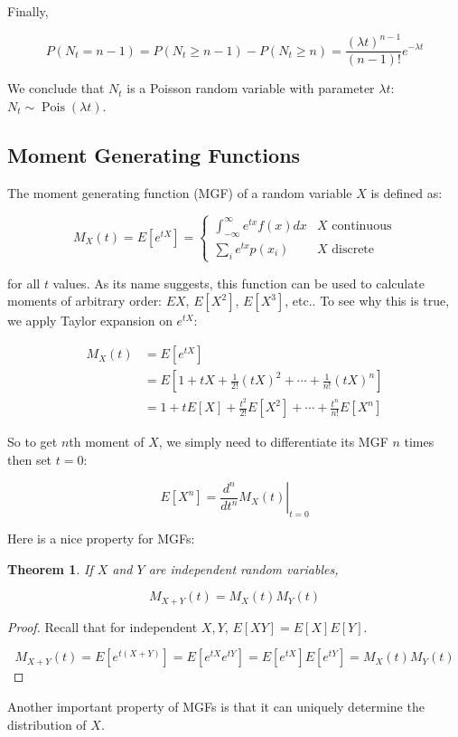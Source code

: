 \documentclass[12pt, a4paper]{article}
\newcommand{\Pois}{\operatorname{Pois}}
\newtheorem*{theorem}{Theorem}
\begin{document}
Finally,

\[P(N_t=n-1)=P(N_t \ge n-1) - P(N_t \ge n) = \frac{(\lambda t)^{n-1}}{(n-1)!} e^{-\lambda t}\]

We conclude that $N_t$ is a Poisson random variable with parameter $\lambda t$: $N_t\sim\Pois(\lambda t)$.

\subsection{Moment Generating Functions}

The moment generating function (MGF) of a random variable $X$ is defined as:

\[M_X(t)=E[e^{tX}]=\begin{cases} \displaystyle\int_{-\infty}^\infty e^{tx} f(x) dx & \text{$X$ continuous} \\[20pt] \displaystyle\sum_i e^{tx} p(x_i) & \text{$X$ discrete} \end{cases}\]

for all $t$ values. As its name suggests, this function can be used to calculate moments of arbitrary order: $EX$, $E[X^2]$, $E[X^3]$, etc.. To see why this is true, we apply Taylor expansion on $e^{tX}$:

\begin{align*}
M_X(t)&=E[e^{tX}] \\
&=E\left[ 1+tX+\frac{1}{2!}(tX)^2+\cdots+\frac{1}{n!}(tX)^n \right] \\
&=1+tE[X]+\frac{t^2}{2!}E[X^2]+\cdots+\frac{t^n}{n!}E[X^n]
\end{align*}

So to get $n$th moment of $X$, we simply need to differentiate its MGF $n$ times then set $t=0$:

\[E[X^n]=\left. \frac{d^n}{dt^n} M_X(t) \right\vert_{t=0}\]

Here is a nice property for MGFs:

\begin{theorem}
If $X$ and $Y$ are independent random variables,

\[M_{X+Y}(t)=M_X(t)M_Y(t)\]
\end{theorem}
\begin{proof}
Recall that for independent $X,Y$, $E[XY]=E[X]E[Y]$.

\[M_{X+Y}(t)=E[e^{t(X+Y)}]=E[e^{tX}e^{tY}]=E[e^{tX}]E[e^{tY}]=M_X(t)M_Y(t)\]
\end{proof}

Another important property of MGFs is that it can uniquely determine the distribution of $X$. \\
\end{document}
